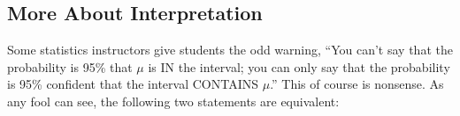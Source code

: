 % 
% 
% 
% 
% 
% 
% 
% 
% 
% 


\subsection{More About Interpretation}

Some statistics instructors give students the odd warning, ``You can't
say that the probability is 95\% that $\mu$ is IN the interval; you can
only say that the probability is 95\% confident that the interval
CONTAINS $\mu$.'' This of course is nonsense.  As any fool can see, the
following two statements are equivalent:

